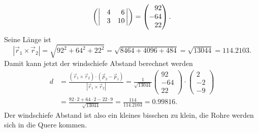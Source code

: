 \begin{loesung}
\begin{align*}
{\begin{pmatrix}
{\def\arraystretch{1.0}
\left|\,\begin{matrix}\phantom{-}4&\phantom{1}6\\\phantom{-}3&          10\end{matrix}\,\right|}
\end{pmatrix}}
=
\begin{pmatrix}
\phantom{-}92\\-64\\\phantom{-}22
\end{pmatrix}.
\end{align*}
Seine Länge ist 
\[
|\vec{r}_1\times\vec{r}_2|
=
\sqrt{92^2+64^2+22^2}=\sqrt{8464+4096+484}=\sqrt{13044}=114.2103.
\]
Damit kann jetzt der windschiefe Abstand berechnet werden
\begin{align*}
d
&=
\frac{(\vec{r}_1\times\vec{r}_2)\cdot (\vec{p}_2 - \vec{p}_1)}{|\vec{r}_1\times \vec{r}_2|}
=
\frac1{\sqrt{13044}}
\begin{pmatrix}92\\-64\\22\end{pmatrix}
\cdot
\begin{pmatrix}2\\-2\\-9 \end{pmatrix}
\\
&=
\frac{92\cdot 2+64\cdot 2-22\cdot 9}{\sqrt{13044}}=\frac{114}{114.2103}=0.99816.
\end{align*}
Der windschiefe Abstand ist also ein kleines bisschen zu klein, die Rohre
werden sich in die Quere kommen.

\end{loesung}
